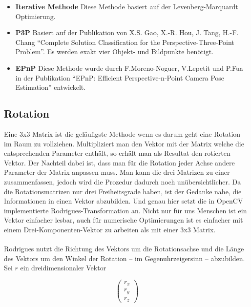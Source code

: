 \documentclass[main.tex]{subfiles}
\begin{document}
\begin{itemize}

\item \textbf{Iterative Methode}
Diese Methode basiert auf der Levenberg-Marquardt Optimierung.

\item \textbf{P3P}
Basiert auf der Publikation von X.S. Gao, X.-R. Hou, J. Tang, H.-F. Chang ``Complete Solution Classification for the Perspective-Three-Point Problem''. Es werden exakt vier Objekt- und Bildpunkte benötigt.

\item \textbf{EPnP}
Diese Methode wurde durch F.Moreno-Noguer, V.Lepetit und P.Fua in der Publikation ``EPnP: Efficient Perspective-n-Point Camera Pose Estimation'' entwickelt.

\end{itemize}

\subsection{Rotation}
Eine 3x3 Matrix ist die geläufigste Methode wenn es darum geht eine Rotation im Raum zu vollziehen. Multipliziert man den Vektor mit der Matrix welche die entsprechenden Parameter enthält, so erhält man als Resultat den rotierten Vektor. Der Nachteil dabei ist, dass man für die Rotation jeder Achse andere Parameter der Matrix anpassen muss. Man kann die drei Matrizen zu einer zusammenfassen, jedoch wird die Prozedur dadurch noch unübersichtlicher. Da die Rotationsmatrizen nur drei Freiheitsgrade haben, ist der Gedanke nahe, die Informationen in einen Vektor abzubilden. Und genau hier setzt die in OpenCV implementierte Rodrigues-Transformation an. Nicht nur für uns Menschen ist ein Vektor einfacher lesbar, auch für numerische Optimierungen ist es einfacher mit einem Drei-Komponenten-Vektor zu arbeiten als mit einer 3x3 Matrix.

\paragraph{}
Rodrigues nutzt die Richtung des Vektors um die Rotationsachse und die Länge des Vektors um den Winkel der Rotation – im Gegenuhrzeigersinn – abzubilden. Sei $r$ ein dreidimensionaler Vektor 

\begin{equation}
\begin{pmatrix} r_x \\ r_y \\ r_z \end{pmatrix}
\end{equation}
\end{document}

